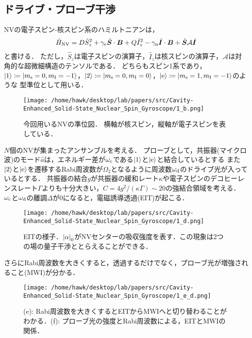       \subsection{ドライブ・プローブ干渉}
        NVの電子スピン-核スピン系のハミルトニアンは，
        \begin{align}
          \hat{H}_{\mathrm{NV}} = D\hat{S}^2_z + \gamma_{\mathrm{e}}\hat{\bm{S}}\cdot\bm{B} + Q\hat{I}^2_z - \gamma_{\mathrm{n}}\hat{\bm{I}}\cdot\bm{B} + \hat{\bm{S}}\mathcal{A}\hat{\bm{I}}
        \end{align}
        と書ける．
        ただし，$\hat{S}_z$は電子スピンの演算子，$\hat{I}_z$は核スピンの演算子，$\mathcal{A}$は対角的な超微細構造のテンソルである．
        どちらもスピン1系であり，$\ket{1} \coloneqq \ket{m_{\mathrm{s}} = 0, m_{\mathrm{I}} = -1}$，$\ket{2} \coloneqq \ket{m_{\mathrm{s}} = 0, m_{\mathrm{I}} = 0}$，$\ket{\mathrm{e}} \coloneqq \ket{m_{\mathrm{s}} = 1, m_{\mathrm{I}} = -1}$のような
        \Lambda 型準位として用いる．
        \begin{figure}[H]
          \centering
          \texttt{[image: /home/hawk/desktop/lab/papers/src/Cavity-Enhanced\_Solid-State\_Nuclear\_Spin\_Gyroscope/1\_b.png]}
          \caption{
            今回用いるNVの準位図．
            横軸が核スピン，縦軸が電子スピンを表している．
          }
        \end{figure}
        $N$個のNVが集まったアンサンブルを考える．
        プローブとして，共振器(マイクロ波)のモード$\hat{a}$は，エネルギー差が$\omega_{\mathrm{c}}$である$\ket{1}$と$\ket{\mathrm{e}}$と結合しているとする
        また$\ket{2}$と$\ket{\mathrm{e}}$を遷移するRabi周波数が$\Omega_2$となるように周波数$\omega_{\mathrm{d}}$のドライブ光が入っているとする．
        共振器の結合$g$が共振器の緩和レート$\kappa$や電子スピンのデコヒーレンスレート$\Gamma$よりも十分大きい，$C = 4g^2 / (\kappa\Gamma) \sim 20$の強結合領域を考える．
        $\omega_{\mathrm{c}}$と$\omega_{\mathrm{d}}$の離調$\Delta$が0になると，電磁誘導透過(EIT)が起こる．
        \begin{figure}[H]
          \centering
          \texttt{[image: /home/hawk/desktop/lab/papers/src/Cavity-Enhanced\_Solid-State\_Nuclear\_Spin\_Gyroscope/1\_d.png]}
          \caption{EITの様子．$\abs{\alpha}_0$がNVセンターの吸収強度を表す．この現象は2つの場の量子干渉ととらえることができる．}
        \end{figure}
        さらにRabi周波数を大きくすると，透過するだけでなく，プローブ光が増強されること(MWI)が分かる．
        \begin{figure}[H]
          \centering
          \texttt{[image: /home/hawk/desktop/lab/papers/src/Cavity-Enhanced\_Solid-State\_Nuclear\_Spin\_Gyroscope/1\_e\_d.png]}
          \caption{(e): Rabi周波数を大きくするとEITからMWIへと切り替わることがわかる．(f): プローブ光の強度とRabi周波数による，EITとMWIの関係．}
        \end{figure}
